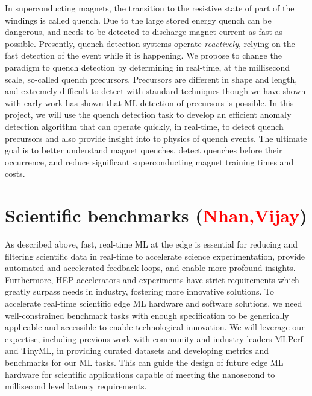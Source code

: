 In superconducting magnets, the transition to the resistive state of part of the windings is called quench. Due to the large stored energy quench can be dangerous, and needs to be detected to discharge magnet current as fast as possible. Presently, quench detection systems operate \textit{reactively}, relying on the fast detection of the event while it is happening. 
We propose to change the paradigm to quench detection by determining in real-time, at the millisecond scale, so-called quench precursors. Precursors are different in shape and length, and extremely difficult to detect with standard techniques though we have shown with early work has shown that ML detection of precursors is possible. 
In this project, we will use the quench detection task to develop an efficient anomaly detection algorithm that can operate quickly, in real-time, to detect quench precursors and also provide insight into to physics of quench events.  The ultimate goal is to better understand magnet quenches, detect quenches before their occurrence, and reduce significant superconducting magnet training times and costs. 


\section*{Scientific benchmarks (\textcolor{red}{Nhan,Vijay})}

As described above, fast, real-time ML at the edge is essential for reducing and filtering scientific data in real-time to accelerate science experimentation, provide automated and accelerated feedback loops, and enable more profound insights. 
Furthermore, HEP accelerators and experiments have strict requirements which greatly surpass needs in industry, fostering more innovative solutions.  
To accelerate real-time scientific edge ML hardware and software solutions, we need well-constrained benchmark tasks with enough specification to be generically applicable and accessible to enable technological innovation.
We will leverage our expertise, including previous work with community and industry leaders MLPerf and TinyML, in providing curated datasets and developing metrics and benchmarks for our ML tasks. This can guide the design of future edge ML hardware for scientific applications capable of meeting the nanosecond to millisecond level latency requirements. 

{\footnotesize
  

}